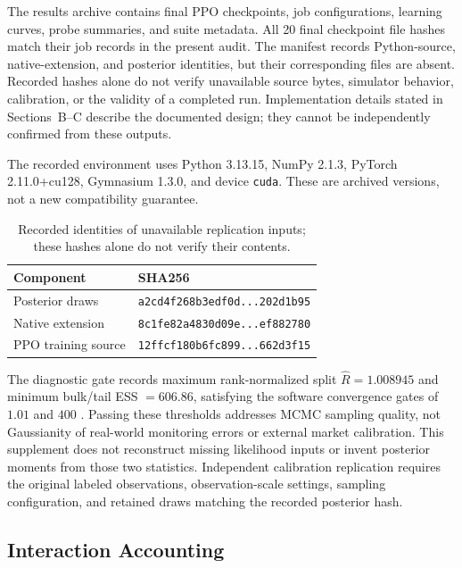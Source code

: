 \documentclass{article}
\begin{document}
The results archive contains final PPO checkpoints, job configurations, learning curves, probe summaries, and suite metadata. All 20 final checkpoint file hashes match their job records in the present audit. The manifest records Python-source, native-extension, and posterior identities, but their corresponding files are absent. Recorded hashes alone do not verify unavailable source bytes, simulator behavior, calibration, or the validity of a completed run. Implementation details stated in Sections~B--C describe the documented design; they cannot be independently confirmed from these outputs.

The recorded environment uses Python 3.13.15, NumPy 2.1.3, PyTorch 2.11.0+cu128, Gymnasium 1.3.0, and device \texttt{cuda}. These are archived versions, not a new compatibility guarantee.

\begin{table}[H]
\centering
\caption{Recorded identities of unavailable replication inputs; these hashes alone do not verify their contents.}
\label{tab:hashes}
\small
\begin{tabular}{@{}ll@{}}
\toprule
Component & SHA256 \\
\midrule
Posterior draws & \texttt{a2cd4f268b3edf0d...202d1b95} \\
Native extension & \texttt{8c1fe82a4830d09e...ef882780} \\
PPO training source & \texttt{12ffcf180b6fc899...662d3f15} \\
\bottomrule
\end{tabular}
\end{table}

The diagnostic gate records maximum rank-normalized split $\hat{R} = 1.008945$ and minimum bulk/tail ESS $= 606.86$, satisfying the software convergence gates of $1.01$ and $400$ \citep{vehtari2021rank}. Passing these thresholds addresses MCMC sampling quality, not Gaussianity of real-world monitoring errors or external market calibration. This supplement does not reconstruct missing likelihood inputs or invent posterior moments from those two statistics. Independent calibration replication requires the original labeled observations, observation-scale settings, sampling configuration, and retained draws matching the recorded posterior hash.

\subsection{Interaction Accounting}
\end{document}
